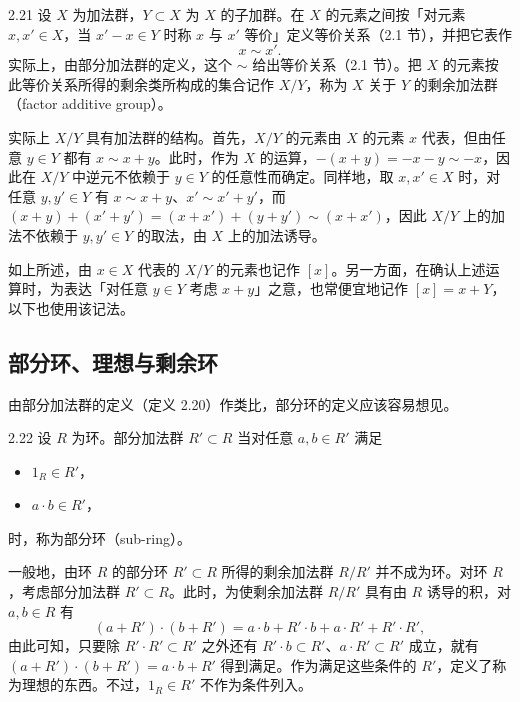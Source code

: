 \begin{definition}{2.21} 设 $X$ 为加法群，$Y\subset X$ 为 $X$ 的子加群。在 $X$ 的元素之间按「对元素 $x,x'\in X$，当 $x'-x\in Y$ 时称 $x$ 与 $x'$ 等价」定义等价关系（2.1 节），并把它表作
\[
  x\sim x' .
\]
实际上，由部分加法群的定义，这个 $\sim$ 给出等价关系（2.1 节）。把 $X$ 的元素按此等价关系所得的剩余类所构成的集合记作 $X/Y$，称为 $X$ 关于 $Y$ 的剩余加法群（factor additive group）。\end{definition}

实际上 $X/Y$ 具有加法群的结构。首先，$X/Y$ 的元素由 $X$ 的元素 $x$ 代表，但由任意 $y\in Y$ 都有 $x\sim x+y$。此时，作为 $X$ 的运算，$-(x+y)=-x-y\sim-x$，因此在 $X/Y$ 中逆元不依赖于 $y\in Y$ 的任意性而确定。同样地，取 $x,x'\in X$ 时，对任意 $y,y'\in Y$ 有 $x\sim x+y$、$x'\sim x'+y'$，而 $(x+y)+(x'+y')=(x+x')+(y+y')\sim(x+x')$，因此 $X/Y$ 上的加法不依赖于 $y,y'\in Y$ 的取法，由 $X$ 上的加法诱导。

如上所述，由 $x\in X$ 代表的 $X/Y$ 的元素也记作 $[x]$。另一方面，在确认上述运算时，为表达「对任意 $y\in Y$ 考虑 $x+y$」之意，也常便宜地记作 $[x]=x+Y$，以下也使用该记法。


\subsection{部分环、理想与剩余环}

由部分加法群的定义（定义 2.20）作类比，部分环的定义应该容易想见。

\begin{definition}{2.22} 设 $R$ 为环。部分加法群 $R'\subset R$ 当对任意 $a,b\in R'$ 满足
\begin{itemize}
  \item $1_R\in R'$，
  \item $a\cdot b\in R'$，
\end{itemize}
时，称为部分环（sub-ring）。\end{definition}

一般地，由环 $R$ 的部分环 $R'\subset R$ 所得的剩余加法群 $R/R'$ 并不成为环。对环 $R$，考虑部分加法群 $R'\subset R$。此时，为使剩余加法群 $R/R'$ 具有由 $R$ 诱导的积，对 $a,b\in R$ 有
\[
  (a+R')\cdot(b+R') = a\cdot b + R'\cdot b + a\cdot R' + R'\cdot R',
\]
由此可知，只要除 $R'\cdot R'\subset R'$ 之外还有 $R'\cdot b\subset R'$、$a\cdot R'\subset R'$ 成立，就有 $(a+R')\cdot(b+R')=a\cdot b+R'$ 得到满足。作为满足这些条件的 $R'$，定义了称为理想的东西。不过，$1_R\in R'$ 不作为条件列入。

